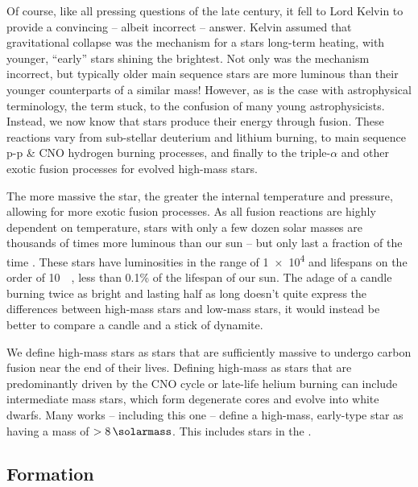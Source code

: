 Of course, like all pressing questions of the late  century, it fell to Lord Kelvin to provide a convincing -- albeit incorrect -- answer.
Kelvin assumed that gravitational collapse was the mechanism for a stars long-term heating, with younger, ``early'' stars shining the brightest.
Not only was the mechanism incorrect, but typically older main sequence stars are more luminous than their younger counterparts of a similar mass!
However, as is the case with astrophysical terminology, the term stuck, to the confusion of many young astrophysicists.
Instead, we now know that stars produce their energy through fusion.
These reactions vary from sub-stellar deuterium and lithium burning, to main sequence p-p \& CNO hydrogen burning processes, and finally to the triple-$\alpha$ and other exotic fusion processes for evolved high-mass stars.

The more massive the star, the greater the internal temperature and pressure, allowing for more exotic fusion processes.
As all fusion reactions are highly dependent on temperature, stars with only a few dozen solar masses are thousands of times more luminous than our sun -- but only last a fraction of the time \parencite{carrollIntroductionModernAstrophysics2014}.
These stars have luminosities in the range of \SI{1e4}{\solarluminosity} and lifespans on the order of \SI{10}{\mega\year}, less than 0.1\% of the lifespan of our sun.
The adage of a candle burning twice as bright and lasting half as long doesn't quite express the differences between high-mass stars and low-mass stars, it would instead be better to compare a candle and a stick of dynamite.

We define high-mass stars as stars that are sufficiently massive to undergo carbon fusion near the end of their lives.
Defining high-mass as stars that are predominantly driven by the CNO cycle or late-life helium burning can include intermediate mass stars, which form degenerate cores and evolve into white dwarfs.
Many works -- including this one -- define a high-mass, early-type star as having a mass of $>\SI{8}{\solarmass}$.
This includes stars in the 
.


\subsection{Formation}
\label{sec:starformation}

